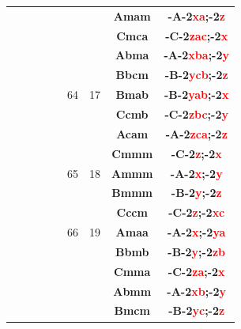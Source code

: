 \documentclass{article}      %
\begin{document}
\begin{small}
\begin{longtable}[c]{|c|c|c|c|c|c|c|c|c|}
          &  & & & &  & &\textbf{Amam}         &\textbf{-A-2\textcolor{red}{xa};-2\textcolor{red}{z}}\\\cline{6-9}        
          &  & & & &  & &\textbf{Cmca}         &\textbf{-C-2\textcolor{red}{zac};-2\textcolor{red}{x}}\\\cline{8-9}       
          &  & & & &  & &\textbf{Abma}         &\textbf{-A-2\textcolor{red}{xba};-2\textcolor{red}{y}}\\\cline{8-9}       
          &  & & & &  & &\textbf{Bbcm}         &\textbf{-B-2\textcolor{red}{ycb};-2\textcolor{red}{z}}\\\cline{8-9}       
	  &  & & & &\textrm{64}  &\textrm{17} &\textbf{Bmab}         &\textbf{-B-2\textcolor{red}{yab};-2\textcolor{red}{x}}\\\cline{8-9}       
          &  & & & &  & &\textbf{Ccmb}         &\textbf{-C-2\textcolor{red}{zbc};-2\textcolor{red}{y}}\\\cline{8-9}       
          &  & & & &  & &\textbf{Acam}         &\textbf{-A-2\textcolor{red}{zca};-2\textcolor{red}{z}}\\\cline{6-9}       
          &  & & & &  & &\textbf{Cmmm}         &\textbf{-C-2\textcolor{red}{z};-2\textcolor{red}{x}}\\\cline{8-9}         
	  &  & & & &\textrm{65}  &\textrm{18} &\textbf{Ammm}         &\textbf{-A-2\textcolor{red}{x};-2\textcolor{red}{y}}\\\cline{8-9}         
          &  & & & &  & &\textbf{Bmmm}         &\textbf{-B-2\textcolor{red}{y};-2\textcolor{red}{z}}\\\cline{6-9}         
          &  & & & &  & &\textbf{Cccm}         &\textbf{-C-2\textcolor{red}{z};-2\textcolor{red}{xc}}\\\cline{8-9}        
	  &  & & & &\textrm{66}  &\textrm{19} &\textbf{Amaa}         &\textbf{-A-2\textcolor{red}{x};-2\textcolor{red}{ya}}\\\cline{8-9}        
          &  & & & &  & &\textbf{Bbmb}         &\textbf{-B-2\textcolor{red}{y};-2\textcolor{red}{zb}}\\\cline{6-9}        
          &  & & & &  & &\textbf{Cmma}         &\textbf{-C-2\textcolor{red}{za};-2\textcolor{red}{x}}\\\cline{8-9}        
          &  & & & &  & &\textbf{Abmm}         &\textbf{-A-2\textcolor{red}{xb};-2\textcolor{red}{y}}\\\cline{8-9}        
          &  & & & &  & &\textbf{Bmcm}         &\textbf{-B-2\textcolor{red}{yc};-2\textcolor{red}{z}}\\\cline{8-9}        

\end{longtable}
\end{small}
\end{document}
